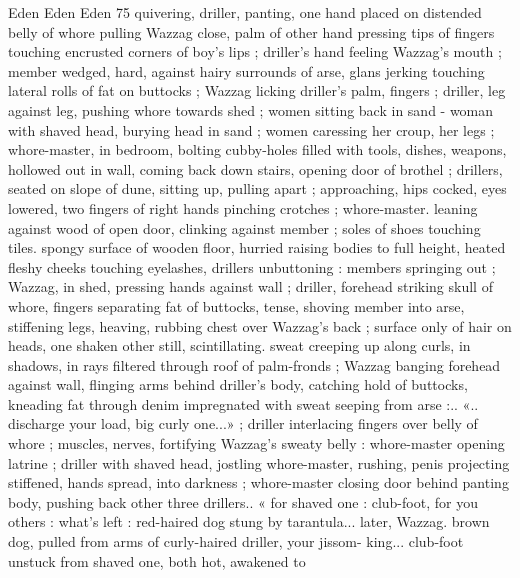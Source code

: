 Eden Eden Eden 75
quivering, driller, panting, one hand placed on distended belly of
whore pulling Wazzag close, palm of other hand pressing tips of
fingers touching encrusted corners of boy's lips ; driller's hand
feeling Wazzag's mouth ; member wedged, hard, against hairy
surrounds of arse, glans jerking touching lateral rolls of fat on
buttocks ; Wazzag licking driller’s palm, fingers ; driller, leg against
leg, pushing whore towards shed ; women sitting back in sand -
woman with shaved head, burying head in sand ; women caressing
her croup, her legs ; whore-master, in bedroom, bolting cubby-holes
filled with tools, dishes, weapons, hollowed out in wall, coming back
down stairs, opening door of brothel ; drillers, seated on slope of
dune, sitting up, pulling apart ; approaching, hips cocked, eyes
lowered, two fingers of right hands pinching crotches ; whore-master.
leaning against wood of open door, clinking against member ; soles
of shoes touching tiles. spongy surface of wooden floor, hurried
raising bodies to full height, heated fleshy cheeks touching
eyelashes, drillers unbuttoning : members springing out ; Wazzag, in
shed, pressing hands against wall ; driller, forehead striking skull of
whore, fingers separating fat of buttocks, tense, shoving member
into arse, stiffening legs, heaving, rubbing chest over Wazzag's back
; surface only of hair on heads, one shaken other still, scintillating.
sweat creeping up along curls, in shadows, in rays filtered through
roof of palm-fronds ; Wazzag banging forehead against wall, flinging
arms behind driller’s body, catching hold of buttocks, kneading fat
through denim impregnated with sweat seeping from arse :.. «..
discharge your load, big curly one...» ; driller interlacing fingers over
belly of whore ; muscles, nerves, fortifying Wazzag's sweaty belly :
whore-master opening latrine ; driller with shaved head, jostling
whore-master, rushing, penis projecting stiffened, hands spread, into
darkness ; whore-master closing door behind panting body, pushing
back other three drillers.. « for shaved one : club-foot, for you others
: what's left : red-haired dog stung by tarantula... later, Wazzag.
brown dog, pulled from arms of curly-haired driller, your jissom-
king... club-foot unstuck from shaved one, both hot, awakened to

